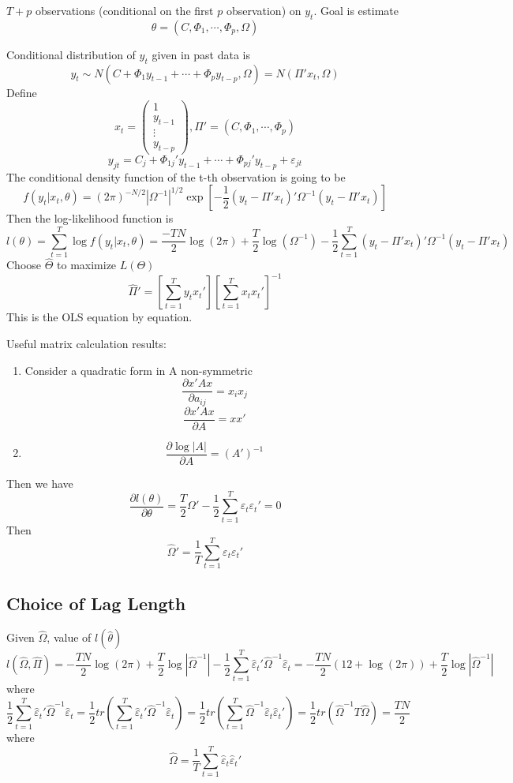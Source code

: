 \documentclass[11pt, a4paper, oneside]{article}
\theoremstyle{definition}
\theoremstyle{proposition}
\theoremstyle{corollary}
\theoremstyle{lemma}
\theoremstyle{theorem}
\begin{document}
$T+ p$ observations (conditional on the first $p$ observation) on $y_t$. Goal is estimate $$\theta = (C, \Phi_1, \cdots, \Phi_p, \Omega)$$ 

Conditional distribution of $y_t$ given in past data is
$$y_t \sim N(C+\Phi_1y_{t-1}+ \cdots+\Phi_{p} y_{t-p},\Omega) = N(\Pi'x_t, \Omega)$$
Define
$$x_t = \begin{pmatrix} 1 \\ y_{t-1} \\ \vdots \\ y_{t-p}\end{pmatrix}, \Pi' = (C, \Phi_1, \cdots, \Phi_p)$$
$$y_{jt} = C_j + \Phi_{1j}'y_{t-1} + \cdots + \Phi_{pj}'y_{t-p} + \varepsilon_{jt}$$
The conditional density function of the t-th observation is going to be $$f(y_t|x_t, \theta) =(2\pi)^{-N/2}\left|\Omega^{-1}\right|^{1/2} \exp\left[-\frac{1}{2}(y_t - \Pi'x_t)' \Omega^{-1}(y_t - \Pi'x_t)\right]$$
Then the log-likelihood function is 
$$l(\theta)= \sum_{t=1}^T \log f(y_t|x_t, \theta)  = \frac{-TN}{2}\log(2\pi) + \frac{T}{2}\log(\Omega^{-1}) - \frac{1}{2}\sum_{t=1}^T (y_t - \Pi'x_t)'\Omega^{-1}(y_t - \Pi'x_t)$$
Choose $\hat{\Theta}$ to maximize $L(\Theta)$
$$\hat{\Pi}' = \left[\sum_{t=1}^T y_tx_t'\right]\left[\sum_{t=1}^Tx_tx_t'\right]^{-1}$$
This is the OLS equation by equation.

Useful matrix calculation results:
\begin{enumerate}
\item Consider a quadratic form in A non-symmetric
$$\frac{\partial x'Ax}{\partial a_{ij}} = x_ix_j$$
$$\frac{\partial x'Ax}{\partial A} = xx'$$
\item $$\frac{\partial \log|A|}{\partial A} = (A')^{-1}$$ 
\end{enumerate}

Then we have
$$\frac{\partial l(\theta)}{\partial \theta} = \frac{T}{2}\Omega' - \frac{1}{2}\sum_{t=1}^T\varepsilon_t\varepsilon_t' = 0$$ 
Then $$\hat{\Omega}' = \frac{1}{T}\sum_{t=1}^T\varepsilon_t\varepsilon_t'$$

\subsection{Choice of Lag Length}
Given $\hat{\Omega}$, value of $l(\hat{\theta})$ 
$$l(\hat{\Omega}, \hat{\Pi}) = -\frac{TN}{2}\log(2\pi) + \frac{T}{2}\log\left|\hat{\Omega}^{-1}\right| - \frac{1}{2}\sum_{t=1}^T\hat{\varepsilon}_t'\hat{\Omega}^{-1} \hat{\varepsilon}_t = -\frac{TN}{2}(12 + \log(2\pi)) + \frac{T}{2}\log\left|\hat{\Omega}^{-1}\right|$$ 
where $$\frac{1}{2}\sum_{t=1}^T\hat{\varepsilon}_t'\hat{\Omega}^{-1} \hat{\varepsilon}_t = \frac{1}{2}tr\left(\sum_{t=1}^T\hat{\varepsilon}_t'\hat{\Omega}^{-1} \hat{\varepsilon}_t \right) =  \frac{1}{2}tr\left(\sum_{t=1}^T\hat{\Omega}^{-1} \hat{\varepsilon}_t\hat{\varepsilon}_t' \right) =\frac{1}{2}tr\left(\hat{\Omega}^{-1}T\hat{\Omega}\right) = \frac{TN}{2}$$ 
where $$\hat{\Omega} = \frac{1}{T}\sum_{t=1}^T\hat{\varepsilon}_t\hat{\varepsilon}_t'$$
\end{document}
